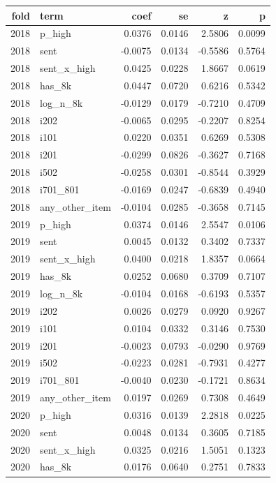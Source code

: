 \begin{tabular}{rlrrrr}
\toprule
fold & term & coef & se & z & p \\
\midrule
2018 & p\_high & 0.0376 & 0.0146 & 2.5806 & 0.0099 \\
2018 & sent & -0.0075 & 0.0134 & -0.5586 & 0.5764 \\
2018 & sent\_x\_high & 0.0425 & 0.0228 & 1.8667 & 0.0619 \\
2018 & has\_8k & 0.0447 & 0.0720 & 0.6216 & 0.5342 \\
2018 & log\_n\_8k & -0.0129 & 0.0179 & -0.7210 & 0.4709 \\
2018 & i202 & -0.0065 & 0.0295 & -0.2207 & 0.8254 \\
2018 & i101 & 0.0220 & 0.0351 & 0.6269 & 0.5308 \\
2018 & i201 & -0.0299 & 0.0826 & -0.3627 & 0.7168 \\
2018 & i502 & -0.0258 & 0.0301 & -0.8544 & 0.3929 \\
2018 & i701\_801 & -0.0169 & 0.0247 & -0.6839 & 0.4940 \\
2018 & any\_other\_item & -0.0104 & 0.0285 & -0.3658 & 0.7145 \\
2019 & p\_high & 0.0374 & 0.0146 & 2.5547 & 0.0106 \\
2019 & sent & 0.0045 & 0.0132 & 0.3402 & 0.7337 \\
2019 & sent\_x\_high & 0.0400 & 0.0218 & 1.8357 & 0.0664 \\
2019 & has\_8k & 0.0252 & 0.0680 & 0.3709 & 0.7107 \\
2019 & log\_n\_8k & -0.0104 & 0.0168 & -0.6193 & 0.5357 \\
2019 & i202 & 0.0026 & 0.0279 & 0.0920 & 0.9267 \\
2019 & i101 & 0.0104 & 0.0332 & 0.3146 & 0.7530 \\
2019 & i201 & -0.0023 & 0.0793 & -0.0290 & 0.9769 \\
2019 & i502 & -0.0223 & 0.0281 & -0.7931 & 0.4277 \\
2019 & i701\_801 & -0.0040 & 0.0230 & -0.1721 & 0.8634 \\
2019 & any\_other\_item & 0.0197 & 0.0269 & 0.7308 & 0.4649 \\
2020 & p\_high & 0.0316 & 0.0139 & 2.2818 & 0.0225 \\
2020 & sent & 0.0048 & 0.0134 & 0.3605 & 0.7185 \\
2020 & sent\_x\_high & 0.0325 & 0.0216 & 1.5051 & 0.1323 \\
2020 & has\_8k & 0.0176 & 0.0640 & 0.2751 & 0.7833 \\

\end{tabular}

